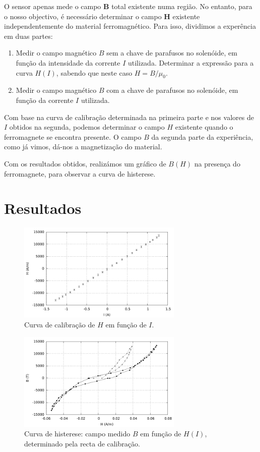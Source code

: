 \documentclass[a4paper]{article}
\begin{document}
O sensor apenas mede o campo \textbf{B} total existente numa região. No entanto, para o nosso objectivo, é necessário determinar o campo \textbf{H} existente independentemente do material ferromagnético. Para isso, dividimos a experência em duas partes:
\begin{enumerate}
\item Medir o campo magnético $B$ sem a chave de parafusos no solenóide, em função da intensidade da corrente $I$ utilizada.  Determinar a expressão para a curva $H(I)$, sabendo que neste caso $H=B/\mu_0$.
\item Medir o campo magnético $B$ com a chave de parafusos no solenóide, em função da corrente $I$ utilizada.
\end{enumerate}

Com base na curva de calibração determinada na primeira parte e nos valores de $I$ obtidos na segunda, podemos determinar o campo $H$ existente quando o ferromagnete se encontra presente. O campo $B$ da segunda parte da experiência, como já vimos, dá-nos a magnetização do material.

Com os resultados obtidos, realizámos um gráfico de $B(H)$ na presença do ferromagnete, para observar a curva de histerese.

\section{Resultados}
\begin{figure}[htbp]
\centering
\includegraphics[width=0.7\textwidth]{./Imagens/grafico1.pdf}
\caption{Curva de calibração de $H$ em função de $I$.}
\end{figure}

\begin{figure}[htbp]
\centering
\includegraphics[width=0.7\textwidth]{./Imagens/grafico2.pdf}
\caption{Curva de histerese: campo medido $B$ em função de $H(I)$, determinado pela recta de calibração.}
\end{figure}
\end{document}
